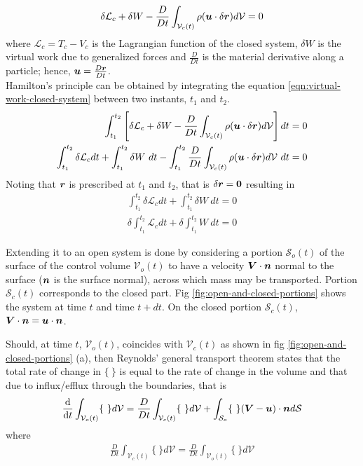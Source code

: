 \documentclass[12pt]{report}
\begin{document}
\begin{align}
   \delta \mathcal{L}_c + \delta W - \frac{D}{Dt}\int_{\mathcal{V}_c(t)} \rho (\vb*{u}\cdot \delta \vb*{r})d\mathcal{V} = 0 \label{eqn:virtual-work-closed-system}
\end{align}
where $\mathcal{L}_c = T_c - V_c$ is the Lagrangian function of the closed system, $\delta W$ is the virtual work due to generalized forces and $\frac{D}{Dt}$ is the material derivative along a particle; hence, $\vb*{u} = \frac{D\vb*{r}}{Dt}$. \\
Hamilton's principle can be obtained by integrating the equation \ref{eqn:virtual-work-closed-system} between two instants, $t_1$ and $t_2$.
  \begin{align*}
   \int_{t_1}^{t_2} \left[\delta \mathcal{L}_c + \delta W - \frac{D}{Dt}\int_{\mathcal{V}_c(t)} \rho (\vb*{u}\cdot \delta \vb*{r})d\mathcal{V}\right] dt = 0 \\
   \int_{t_1}^{t_2}\delta \mathcal{L}_cdt + \int_{t_1}^{t_2} \delta W~dt - \int_{t_1}^{t_2}\frac{D}{Dt}\int_{\mathcal{V}_c(t)} \rho (\vb*{u}\cdot \delta \vb*{r})d\mathcal{V}~ dt = 0
  \end{align*}
Noting that $\vb*{r}$ is prescribed at $t_1$ and $t_2$, that is $\delta\vb*{r} = \vb*{0}$ resulting in 
 \begin{align*}
\int_{t_1}^{t_2}\delta \mathcal{L}_cdt + \int_{t_1}^{t_2} \delta W~dt = 0 \\
\delta \int_{t_1}^{t_2}\mathcal{L}_cdt + \delta \int_{t_1}^{t_2}W~dt = 0 
\end{align*}

Extending it to an open system is done by considering a portion $\mathcal{S}_o (t)$ of the surface of the control volume $\mathcal{V}_o (t)$ to have a velocity $\vb*{V}\cdot \vb*{n}$ normal to the surface ($\vb*{n}$ is the surface normal), across which mass may be transported. Portion $\mathcal{S}_c (t)$ corresponds to the closed part. Fig \ref{fig:open-and-closed-portions} shows the system at time $t$ and time $t+dt$. On the closed portion $\mathcal{S}_c (t)$, $\vb*{V}\cdot \vb*{n} = \vb*{u}\cdot \vb*{n}$.

Should, at time $t$, $\mathcal{V}_o (t)$, coincides with $\mathcal{V}_c (t)$ as shown in fig \ref{fig:open-and-closed-portions} (a), then Reynolds' general transport theorem states that the total rate of change in $\{ ~\}$ is equal to the rate of change in the volume and that due to influx/efflux through the boundaries, that is
\begin{align}
  \dv{}{t} \int_{\mathcal{V}_o (t)} \{~\}d\mathcal{V} = \frac{D}{Dt} \int_{\mathcal{V}_c (t)} \{~ \} d\mathcal{V} + \int_{\mathcal{S}_o} \{ ~\} (\vb*{V} - \vb*{u}) \cdot \vb*{n} d\mathcal{S} \label{eqn:reynolds-transport-theorem}
\end{align}
where 
\begin{align*}
  \frac{D}{Dt} \int_{\mathcal{V}_c (t)} \{~ \} d\mathcal{V} = \frac{D}{Dt} \int_{\mathcal{V}_o (t)} \{~ \} d\mathcal{V}
\end{align*}
\end{document}
